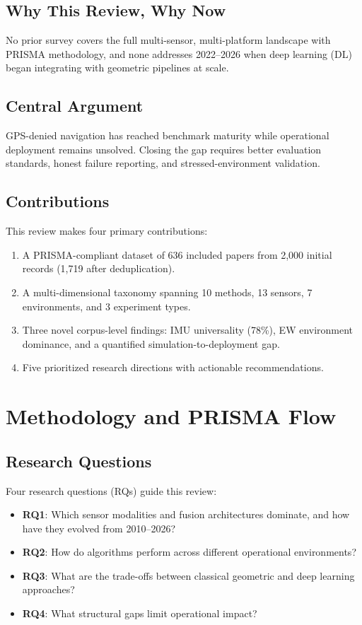 \documentclass[journal]{IEEEtran}
\begin{document}
\subsection{Why This Review, Why Now}
No prior survey covers the full multi-sensor, multi-platform landscape with
PRISMA methodology, and none addresses 2022--2026 when deep learning (DL)
began integrating with geometric pipelines at scale.

\subsection{Central Argument}
GPS-denied navigation has reached benchmark maturity while operational
deployment remains unsolved. Closing the gap requires better evaluation
standards, honest failure reporting, and stressed-environment validation.

\subsection{Contributions}
This review makes four primary contributions:
\begin{enumerate}
  \item A PRISMA-compliant dataset of 636 included papers from 2,000
        initial records (1,719 after deduplication).
  \item A multi-dimensional taxonomy spanning 10 methods, 13 sensors,
        7 environments, and 3 experiment types.
  \item Three novel corpus-level findings: IMU universality (78\%), EW
        environment dominance, and a quantified simulation-to-deployment gap.
  \item Five prioritized research directions with actionable recommendations.
\end{enumerate}

\section{Methodology and PRISMA Flow}
\label{sec:method}

\subsection{Research Questions}
Four research questions (RQs) guide this review:
\begin{itemize}
  \item \textbf{RQ1}: Which sensor modalities and fusion architectures
        dominate, and how have they evolved from 2010--2026?
  \item \textbf{RQ2}: How do algorithms perform across different
        operational environments?
  \item \textbf{RQ3}: What are the trade-offs between classical geometric
        and deep learning approaches?
  \item \textbf{RQ4}: What structural gaps limit operational impact?
\end{itemize}
\end{document}
